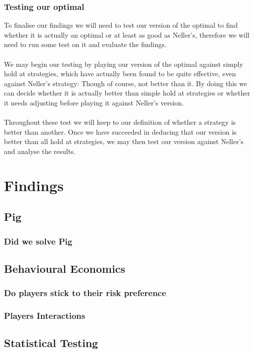 \documentclass[a4paper,titlepage]{article}
\begin{document}
\subsubsection{Testing our optimal}
To finalise our findings we will need to test our version of the optimal to find whether it is actually an optimal or at least as good as Neller’s\citep{neller2004optimal}, therefore we will need to run some test on it and evaluate the findings.\\ \\
We may begin our testing by playing our version of the optimal against simply hold at strategies, which have actually been found to be quite effective, even against Neller’s strategy:  Though of course, not better than it. By doing this we can decide whether it is actually better than simple hold at strategies or whether it needs adjusting before playing it against Neller’s version.\\ \\
Throughout these test we will keep to our definition of whether a strategy is better than another. Once we have succeeded in deducing that our version is better than all hold at strategies, we may then test our version against Neller’s and analyse the results.


\section{Findings}
\subsection{Pig}
\subsubsection{Did we solve Pig}

\subsection{Behavioural Economics}
\subsubsection{Do players stick to their risk preference}
\subsubsection{Players Interactions}

\subsection{Statistical Testing}
\end{document}
